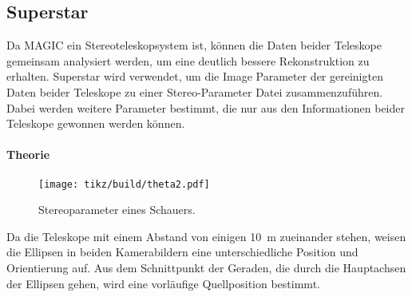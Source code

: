 \subsection{Superstar}%
\label{sub:superstar}

Da MAGIC ein Stereoteleskopsystem ist,
können die Daten beider Teleskope gemeinsam analysiert werden,
um eine deutlich bessere Rekonstruktion zu erhalten.
Superstar wird verwendet,
um die Image Parameter der gereinigten Daten beider
Teleskope zu einer Stereo-Parameter Datei zusammenzuführen.
Dabei werden weitere Parameter bestimmt,
die nur aus den Informationen beider Teleskope gewonnen werden können.

\paragraph{Theorie}%

\begin{wrapfigure}[14]{O}{0.4\textwidth}
  \centering
  \texttt{[image: tikz/build/theta2.pdf]}
  \caption{Stereoparameter eines Schauers.}%
  \label{fig:reco}
\end{wrapfigure}

Da die Teleskope mit einem Abstand von einigen \SI{10}{\meter} zueinander
stehen,
weisen die Ellipsen in beiden Kamerabildern eine unterschiedliche Position und
Orientierung auf.
Aus dem Schnittpunkt der Geraden,
die durch die Hauptachsen der Ellipsen gehen,
wird eine vorläufige Quellposition bestimmt.



